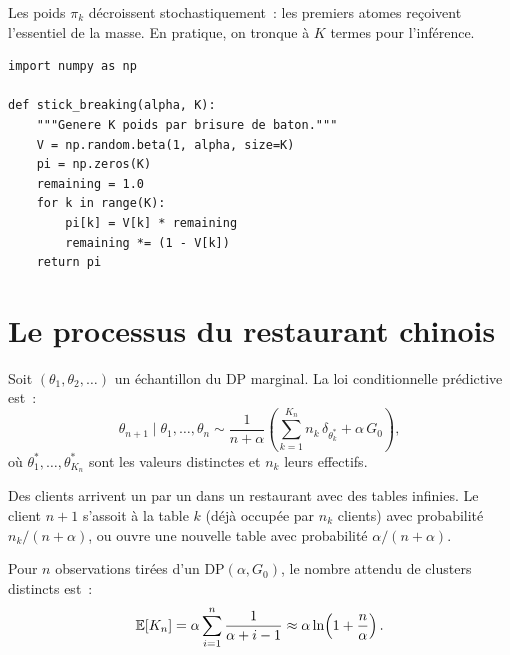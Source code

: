 \begin{remarque}
Les poids $\pi_k$ d\'ecroissent stochastiquement~: les premiers atomes
re\c{c}oivent l'essentiel de la masse. En pratique, on tronque \`a $K$
termes pour l'inf\'erence.
\end{remarque}

\begin{verbatim}
import numpy as np

def stick_breaking(alpha, K):
    """Genere K poids par brisure de baton."""
    V = np.random.beta(1, alpha, size=K)
    pi = np.zeros(K)
    remaining = 1.0
    for k in range(K):
        pi[k] = V[k] * remaining
        remaining *= (1 - V[k])
    return pi
\end{verbatim}

\section{Le processus du restaurant chinois}

\begin{definition}
Soit $(\theta_1, \theta_2, \ldots)$ un \'echantillon du DP marginal.
La loi conditionnelle pr\'edictive est~:
\[
  \theta_{n+1} \mid \theta_1, \ldots, \theta_n \sim
  \frac{1}{n + \alpha}\left(\sum_{k=1}^{K_n} n_k\,\delta_{\theta_k^*}
  + \alpha\,G_0\right),
\]
o\`u $\theta_1^*, \ldots, \theta_{K_n}^*$ sont les valeurs distinctes et $n_k$
leurs effectifs.
\end{definition}

\begin{intuition}[title=\textbf{M\'etaphore du restaurant}]
Des clients arrivent un par un dans un restaurant avec des tables infinies.
Le client $n+1$ s'assoit \`a la table $k$ (d\'ej\`a occup\'ee par $n_k$ clients)
avec probabilit\'e $n_k / (n + \alpha)$, ou ouvre une nouvelle table avec
probabilit\'e $\alpha / (n + \alpha)$.
\end{intuition}

\begin{proposition}
Pour $n$ observations tir\'ees d'un $\mathrm{DP}(\alpha, G_0)$, le nombre
attendu de clusters distincts est~:
\[
  \mathbb{E}[K_n] = \alpha \sum_{i=1}^{n} \frac{1}{\alpha + i - 1}
           \approx \alpha \ln\!\left(1 + \frac{n}{\alpha}\right).
\]
\end{proposition}

